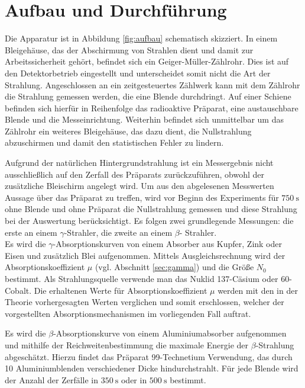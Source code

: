 \section{Aufbau und Durchf\"uhrung}
\label{sec:Durchfuehrung}

Die Apparatur ist in Abbildung \ref{fig:aufbau} schematisch skizziert.
In einem Bleigehäuse, das der Abschirmung von Strahlen dient und damit zur Arbeitssicherheit gehört, befindet sich ein Geiger-Müller-Zählrohr.
Dies ist auf den Detektorbetrieb eingestellt und unterscheidet somit nicht die Art der Strahlung.
Angeschlossen an ein zeitgesteuertes Zählwerk kann mit dem Zählrohr die Strahlung gemessen werden, die eine Blende durchdringt.
Auf einer Schiene befinden sich hierfür in Reihenfolge das radioaktive Präparat, eine austauschbare Blende und die Messeinrichtung.
Weiterhin befindet sich unmittelbar um das Zählrohr ein weiteres Bleigehäuse, das dazu dient, die Nullstrahlung abzuschirmen und damit den statistischen Fehler zu lindern.

Aufgrund der natürlichen Hintergrundstrahlung ist ein Messergebnis nicht ausschließlich auf den Zerfall des Präparats zurückzuführen, obwohl der zusätzliche Bleischirm angelegt wird.
Um aus den abgelesenen Messwerten Aussage über das Präparat zu treffen, wird vor Beginn des Experiments für $\SI{750}{\second}$ ohne Blende und ohne Präparat die Nullstrahlung gemessen und diese Strahlung bei der Auswertung berücksichtigt.
Es folgen zwei grundlegende Messungen: die erste an einem \texorpdfstring{$\gamma$}{Gamma}-Strahler, die zweite an einem \texorpdfstring{$\beta$}{Beta}-
Strahler.\\
Es wird die \texorpdfstring{$\gamma$}{Gamma}-Absorptionskurven von einem Absorber aus Kupfer, Zink oder Eisen und zusätzlich Blei aufgenommen.
Mittels Ausgleichsrechnung wird der Absorptionskoeffizient $\mu$ (vgl. Abschnitt \ref{sec:gamma}) und die Größe $N_0$ bestimmt. 
Als Strahlungsquelle verwende man das Nuklid 137-Cäsium oder 60-Cobalt. 
Die erhaltenen Werte für Absorptionskoeffizient $\mu$ werden mit den in der Theorie vorhergesagten Werten verglichen und somit erschlossen, 
welcher der vorgestellten Absorptionsmechanismen im vorliegenden Fall auftrat.

Es wird die \texorpdfstring{$\beta$}{Beta}-Absorptionskurve von einem Aluminiumabsorber aufgenommen und 
mithilfe der Reichweitenbestimmung die maximale Energie der \texorpdfstring{$\beta$}{Beta}-Strahlung abgeschätzt.
Hierzu findet das Präparat 99-Technetium Verwendung, das durch 10 Aluminiumblenden verschiedener Dicke hindurchstrahlt.
Für jede Blende wird der Anzahl der Zerfälle in $\SI{350}{\second}$ oder in $\SI{500}{\second}$ bestimmt.